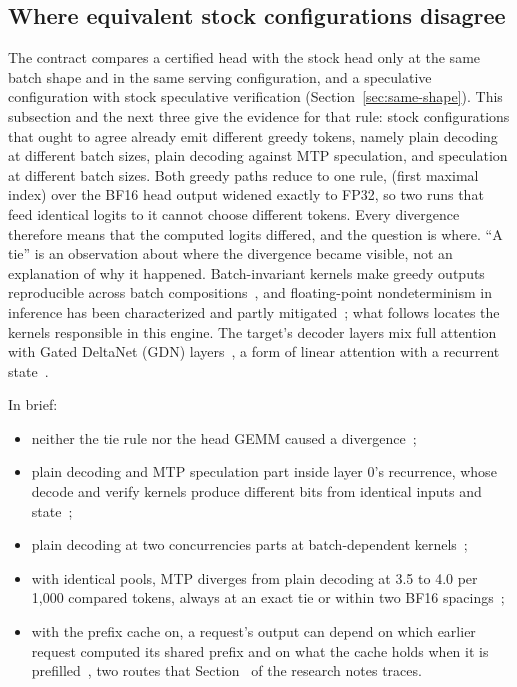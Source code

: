 \subsection{Where equivalent stock configurations disagree}\label{app:divergence}\label{sec:divergence}
The contract compares a certified head with the stock head only at the same batch shape and in the same serving configuration, and a speculative configuration with stock speculative verification (Section~\ref{sec:same-shape}). This subsection and the next three give the evidence for that rule: stock configurations that ought to agree already emit different greedy tokens, namely plain decoding at different batch sizes, plain decoding against MTP speculation, and speculation at different batch sizes. Both greedy paths reduce to one rule,  (first maximal index) over the BF16 head output widened exactly to FP32, so two runs that feed identical logits to it cannot choose different tokens. Every divergence therefore means that the computed logits differed, and the question is where. ``A tie'' is an observation about where the divergence became visible, not an explanation of why it happened. Batch-invariant kernels make greedy outputs reproducible across batch compositions~\cite{he2025nondeterminism}, and floating-point nondeterminism in inference has been characterized and partly mitigated~\cite{yuan2025nondeterminism}; what follows locates the kernels responsible in this engine. The target's decoder layers mix full attention with Gated DeltaNet (GDN) layers~\cite{qwenconfig}, a form of linear attention with a recurrent state~\cite{gdn}.

\par\noindent\begin{minipage}{\linewidth}
In brief:
\begin{itemize}
\item neither the tie rule nor the head GEMM caused a divergence~;
\item plain decoding and MTP speculation part inside layer 0's recurrence, whose decode and verify kernels produce different bits from identical inputs and state~;
\item plain decoding at two concurrencies parts at batch-dependent kernels~;
\item with identical pools, MTP diverges from plain decoding at 3.5 to 4.0 per 1,000 compared tokens, always at an exact tie or within two BF16 spacings~;
\item with the prefix cache on, a request's output can depend on which earlier request computed its shared prefix and on what the cache holds when it is prefilled~, two routes that Section~ of the research notes traces.
\end{itemize}
\end{minipage}\par

